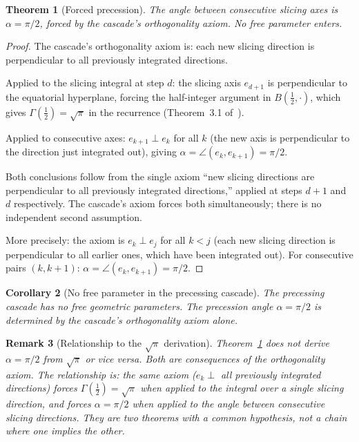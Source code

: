 \documentclass[12pt,a4paper]{article}
\newtheorem{theorem}{Theorem}[section]
\newtheorem{corollary}[theorem]{Corollary}
\newtheorem{remark}[theorem]{Remark}
\begin{document}
\begin{theorem}[Forced precession]\label{thm:precession}
The angle between consecutive slicing axes is $\alpha = \pi/2$, forced by the cascade's
orthogonality axiom. No free parameter enters.
\end{theorem}
\begin{proof}
The cascade's orthogonality axiom is: each new slicing direction is perpendicular to all
previously integrated directions.

Applied to the slicing integral at step $d$: the slicing axis $e_{d+1}$ is perpendicular to
the equatorial hyperplane, forcing the half-integer argument in
$B(\frac{1}{2},\cdot)$, which gives $\Gamma(\frac{1}{2})=\sqrt{\pi}$ in the recurrence
(Theorem~3.1 of~\cite{part0}).

Applied to consecutive axes: $e_{k+1}\perp e_k$ for all $k$ (the new axis is perpendicular
to the direction just integrated out), giving
$\alpha=\angle(e_k,e_{k+1})=\pi/2$.

Both conclusions follow from the
single axiom ``new slicing directions are perpendicular to all previously integrated
directions,'' applied at steps $d+1$ and $d$ respectively. The cascade's axiom forces both
simultaneously; there is no independent second assumption.

More precisely: the axiom is $e_k\perp e_j$ for all $k<j$ (each new slicing direction is
perpendicular to all earlier ones, which have been integrated out). For consecutive pairs
$(k,k+1)$: $\alpha=\angle(e_k,e_{k+1})=\pi/2$.
\end{proof}

\begin{corollary}[No free parameter in the precessing cascade]\label{cor:nofree}
The precessing cascade has no free geometric parameters. The precession angle $\alpha=\pi/2$
is determined by the cascade's orthogonality axiom alone.
\end{corollary}

\begin{remark}[Relationship to the $\sqrt{\pi}$ derivation]
Theorem~\ref{thm:precession} does not derive $\alpha=\pi/2$ from $\sqrt{\pi}$ or vice
versa. Both are consequences of the orthogonality axiom. The relationship is: the same
axiom ($e_k\perp$ all previously integrated directions) forces $\Gamma(\tfrac{1}{2})
=\sqrt{\pi}$ when applied to the integral over a single slicing direction, and forces
$\alpha=\pi/2$ when applied to the angle between consecutive slicing directions. They are
two theorems with a common hypothesis, not a chain where one implies the other.
\end{remark}
\end{document}
